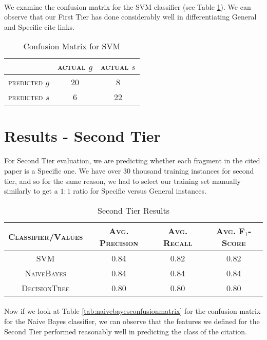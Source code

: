 \paragraph{}
We examine the confusion matrix for the SVM classifier (see Table \ref{tab:svmconfusionmatrix}). We can observe that our First Tier has done considerably well in differentiating General and Specific cite links.

\begin{table}[h]
	\center
	\begin{tabular}{ c | c  c }
		 & \textsc{actual $g$} & \textsc{actual $s$} \\
		\hline
		\textsc{predicted $g$} 	& 20 & 8 \\
		\textsc{predicted $s$}		& 6 & 22
	\end{tabular}
	\caption{Confusion Matrix for SVM}
	\label{tab:svmconfusionmatrix}
\end{table}

\section{Results - Second Tier}
\paragraph{}
For Second Tier evaluation, we are predicting whether each fragment in the cited paper is a Specific one. We have over 30 thousand training instances for second tier, and so for the same reason, we had to select our training set manually similarly to get a $1:1$ ratio for Specific versus General instances.

\begin{table}[h]
	\center
	\begin{tabular}{ c | c  c  c }
		\textsc{Classifier/Values} & \textsc{Avg. Precision} & \textsc{Avg. Recall} & \textsc{Avg. F$_1$-Score} \\
		\hline
		\textsc{SVM} 			& 0.84 & 0.82 & 0.82 \\
		\textsc{NaiveBayes} 	& 0.84 & 0.84 & 0.84 \\
		\textsc{DecisionTree}	& 0.80 & 0.80 & 0.80
	\end{tabular}
	\caption{Second Tier Results}
	\label{tab:secondtieresults}
\end{table}
\newpage
\paragraph{}
Now if we look at Table \ref{tab:naivebayesconfusionmatrix} for the confusion matrix for the Naive Bayes classifier, we can observe that the features we defined for the Second Tier performed reasonably well in predicting the class of the citation. 

